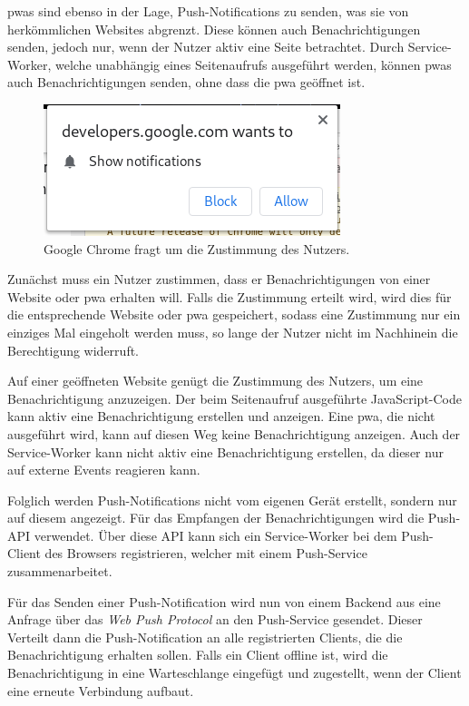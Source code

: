 \documentclass[12pt, parskip=half]{scrartcl}       %
\begin{document}
\acp{pwa} sind ebenso in der Lage, Push-Notifications zu senden, was sie von herkömmlichen Websites abgrenzt.
Diese können auch Benachrichtigungen senden, jedoch nur, wenn der Nutzer aktiv eine Seite betrachtet.
Durch Service-Worker, welche unabhängig eines Seitenaufrufs ausgeführt werden, können \acp{pwa} auch Benachrichtigungen senden, ohne dass die \ac{pwa} geöffnet ist\cite{ejaz_progressive_pushnotifications}.

\begin{figure}[h]
  \centering
  \includegraphics[width=0.4\linewidth]{src/permission-request-chrome.png}
  \caption{Google Chrome fragt um die Zustimmung des Nutzers.}
  \label{fig:chrome_permission}
\end{figure}

Zunächst muss ein Nutzer zustimmen, dass er Benachrichtigungen von einer Website oder \ac{pwa} erhalten will.
Falls die Zustimmung erteilt wird, wird dies für die entsprechende Website oder \ac{pwa} gespeichert, sodass eine Zustimmung nur ein einziges Mal eingeholt werden muss, so lange der Nutzer nicht im Nachhinein die Berechtigung widerruft.

Auf einer geöffneten Website genügt die Zustimmung des Nutzers, um eine Benachrichtigung anzuzeigen.
Der beim Seitenaufruf ausgeführte JavaScript-Code kann aktiv eine Benachrichtigung erstellen und anzeigen.
Eine \ac{pwa}, die nicht ausgeführt wird, kann auf diesen Weg keine Benachrichtigung anzeigen.
Auch der Service-Worker kann nicht aktiv eine Benachrichtigung erstellen, da dieser nur auf externe Events reagieren kann.

Folglich werden Push-Notifications nicht vom eigenen Gerät erstellt, sondern nur auf diesem angezeigt.
Für das Empfangen der Benachrichtigungen wird die Push-API\cite{w3c_pushapi} verwendet.
Über diese API kann sich ein Service-Worker bei dem Push-Client des Browsers registrieren, welcher mit einem Push-Service zusammenarbeitet.



Für das Senden einer Push-Notification wird nun von einem Backend aus eine Anfrage über das \textit{Web Push Protocol}\cite{ietf_webpush} an den Push-Service gesendet.
Dieser Verteilt dann die Push-Notification an alle registrierten Clients, die die Benachrichtigung erhalten sollen.
Falls ein Client offline ist, wird die Benachrichtigung in eine Warteschlange eingefügt und zugestellt, wenn der Client eine erneute Verbindung aufbaut\cite{googledev_webpush}.
\end{document}
